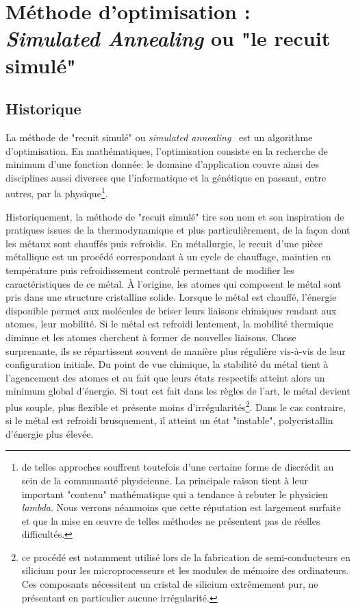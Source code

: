 \documentclass[10pt,a4paper,twoside]{report}
\begin{document}
\renewcommand{\chaptername}{Projet}

\setcounter{chapter}{0}
\chapter{Méthode d'optimisation : \emph{Simulated Annealing} ou "le recuit simulé"}
\label{projet::simulated_annealing}

\section{Historique}

La méthode de "recuit simulé" ou \emph{simulated
  annealing}~\cite{kirk1,kirk2} est un algorithme d'optimisation. En
mathématiques, l'optimisation consiste en la recherche de minimum
d'une fonction donnée: le domaine d'application couvre ainsi des
disciplines aussi diverses que l'informatique et la génétique en
passant, entre autres, par la physique\footnote{de telles approches
  souffrent toutefois d'une certaine forme de discrédit au sein de la
  communauté physicienne. La principale raison tient à leur important
  "contenu" mathématique qui a tendance à rebuter le physicien
  \emph{lambda}. Nous verrons néanmoins que cette réputation est
  largement surfaite et que la mise en \oe uvre de telles méthodes ne
  présentent pas de réelles difficultés.}.

Historiquement, la méthode de "recuit simulé" tire son nom et son
inspiration de pratiques issues de la thermodynamique et plus
particulièrement, de la façon dont les métaux sont chauffés puis
refroidis. En métallurgie, le recuit d'une pièce métallique est un
procédé correspondant à un cycle de chauffage, maintien en température
puis refroidissement controlé permettant de modifier les
caractéristiques de ce métal. \`A l'origine, les atomes qui composent
le métal sont pris dans une structure cristalline solide. Lorsque le
métal est chauffé, l'énergie disponible permet aux molécules de briser
leurs liaisons chimiques rendant aux atomes, leur mobilité. Si le
métal est refroidi lentement, la mobilité thermique diminue et les
atomes cherchent à former de nouvelles liaisons. Chose surprenante,
ils se répartissent souvent de manière plus régulière vis-à-vis de
leur configuration initiale. Du point de vue chimique, la stabilité du
métal tient à l'agencement des atomes et au fait que leurs états
respectifs atteint alors un minimum global d'énergie. Si tout est fait
dans les règles de l'art, le métal devient plus souple, plus flexible
et présente moins d'irrégularités\footnote{ce procédé est notamment
  utilisé lors de la fabrication de semi-conducteurs en silicium pour
  les microprocesseurs et les modules de mémoire des ordinateurs. Ces
  composants nécessitent un cristal de silicium extrêmement pur, ne
  présentant en particulier aucune irrégularité.}. Dans le cas
contraire, si le métal est refroidi brusquement, il atteint un état
"instable", polycristallin d'énergie plus élevée.
\end{document}
